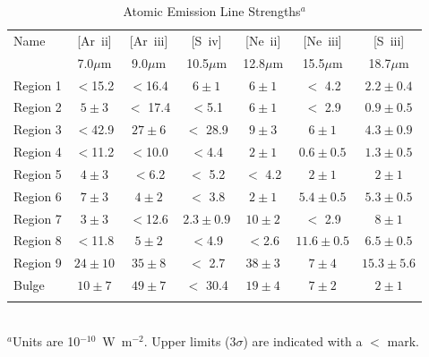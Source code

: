 \begin{table}
 \centering
 \begin{minipage}{100mm}
\caption{Atomic Emission Line Strengths$^a$}
  \begin{tabular}{l c c  c  c  c  c  }
  \hline{Name  }&{[Ar~{\sc ii}] }&{[Ar~{\sc iii}]  }&{[S~{\sc iv}]}&{[Ne~{\sc ii}]   }&{[Ne~{\sc iii}]   }&{[S~{\sc iii}]  }\\
{}&{\tiny{7.0$\mu$m} }&{\tiny{9.0$\mu$m }}&{\tiny{10.5$\mu$m}}&{\tiny{12.8$\mu$m  }}&{\tiny{15.5$\mu$m } }&{\tiny{18.7$\mu$m }} 
   \\
 \hline 
 
Region 1 &    $<$15.2                 & $<$16.4                 & $6\pm1$                 & $6\pm1$                 & $<$ 4.2                 & $2.2\pm0.4$                \\
Region 2 &    $5\pm3$                 & $<$ 17.4               & $<$5.1                    & $6\pm1$                 & $<$ 2.9                 & $0.9\pm0.5$                 \\
Region 3 &    $<$42.9                 & $27\pm6$              & $<$ 28.9                & $9\pm3$                 & $6\pm1$               & $4.3\pm0.9$                 \\
Region 4 &    $<$11.2                 & $<$10.0                 & $<$4.4                    & $2\pm1$                 & $0.6\pm0.5$        & $1.3\pm0.5$                 \\
Region 5 &    $4\pm3$                 & $<$6.2                   & $<$ 5.2                 & $<$ 4.2                     & $2\pm1$               & $2\pm1$                 \\
Region 6 &    $7\pm3$                & $4\pm2$                 & $<$ 3.8                 & $2\pm1$                  & $5.4\pm0.5$         & $5.3\pm0.5$                 \\
Region 7 &    $3\pm3$                 & $<$12.6                 & $2.3\pm0.9$        & $10\pm2$                & $<$ 2.9                 & $8\pm1$                \\
Region 8 &    $<$11.8                  & $5\pm2$                & $<$4.9                  & $<$2.6                      & $11.6\pm0.5$     & $6.5\pm0.5$                 \\
Region 9 &    $24\pm10$             & $35\pm8$             & $<$ 2.7                 & $38\pm3$                 & $7\pm4$               & $15.3\pm5.6$                 \\
Bulge &          $10\pm7$               & $49\pm7$              & $<$ 30.4               & $19\pm4$                 & $7\pm2$               & $2\pm1$      \\            

\hline
 \label{Atomic}
\end{tabular}\\
{ $^a$Units are 10$^{-10}$~W~m$^{-2}$. Upper limits ($3\sigma$) are indicated with a $<$ mark.  }

\end{minipage}
\end{table}

